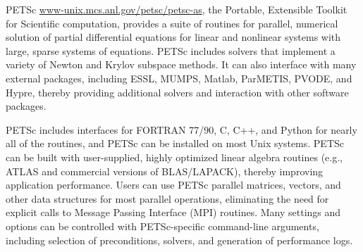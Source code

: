 PETSc \url{www-unix.mcs.anl.gov/petsc/petsc-as}, the Portable,
Extensible Toolkit for Scientific computation, provides a suite of
routines for parallel, numerical solution of partial differential
equations for linear and nonlinear systems with large, sparse systems
of equations.  PETSc includes solvers that implement a variety of
Newton and Krylov subspace methods. It can also interface with many
external packages, including ESSL, MUMPS, Matlab, ParMETIS, PVODE, and
Hypre, thereby providing additional solvers and interaction with other
software packages.

PETSc includes interfaces for FORTRAN 77/90, C, C++, and Python for
nearly all of the routines, and PETSc can be installed on most Unix
systems. PETSc can be built with user-supplied, highly optimized
linear algebra routines (e.g., ATLAS and commercial versions of
BLAS/LAPACK), thereby improving application performance. Users can use
PETSc parallel matrices, vectors, and other data structures for most
parallel operations, eliminating the need for explicit calls to
Message Passing Interface (MPI) routines. Many settings and options
can be controlled with PETSc-specific command-line arguments,
including selection of preconditions, solvers, and generation of
performance logs.



